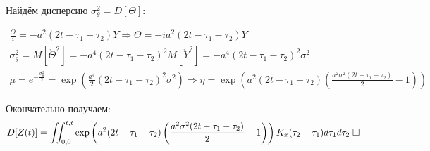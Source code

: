 \documentclass[a4paper,12pt]{article}
\begin{document}
Найдём дисперсию $ \sigma_\theta^2 = D[\Theta] $:

\begin{gather*}
    \frac{\Theta}{i} = -a^2(2t-\tau_1 -\tau_2)Y \Rightarrow \Theta = -i a^2(2t-\tau_1 -\tau_2)Y \\
    \sigma_\theta^2 = M[\mathring \Theta^2] = -a^4(2t-\tau_1-\tau_2)^2 M[\mathring Y^2] = -a^4(2t-\tau_1-\tau_2)^2\sigma^2\\
    \mu=e^{-\frac{\sigma_\theta^2}{2}}=\exp \left(\frac{a^4}{2}(2t-\tau_1-\tau_2)^2\sigma^2\right) \Rightarrow \eta = \exp \left( a^2(2t-\tau_1-\tau_2) \left( \frac{a^2\sigma^2(2t-\tau_1-\tau_2)}{2} - 1 \right) \right)
\end{gather*}

Окончательно получаем:
\begin{align*}
    D[Z(t)] = \iint_{0,0}^{t,t} \exp \left( a^2(2t-\tau_1-\tau_2) \left( \frac{a^2\sigma^2(2t-\tau_1-\tau_2)}{2} - 1 \right) \right)  K_x(\tau_2-\tau_1) d\tau_1 d\tau_2 \thickspace \square
\end{align*}
\end{document}
